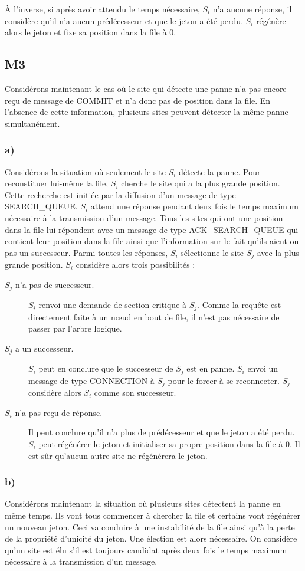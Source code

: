 À l'inverse, si après avoir attendu le temps nécessaire, $S_i$ n'a aucune réponse, il considère qu'il n'a aucun prédécesseur et que le jeton a été perdu. $S_i$ régénère alors le jeton et fixe sa position dans la file à $0$.

\subsection{M3}
Considérons maintenant le cas où le site qui détecte une panne n'a pas encore reçu de message de COMMIT et n'a donc pas de position dans la file. En l'absence de cette information, plusieurs sites peuvent détecter la même panne simultanément.

\subsubsection{a)}
Considérons la situation où seulement le site $S_i$ détecte la panne. Pour reconstituer lui-même la file, $S_i$ cherche le site qui a la plus grande position. Cette recherche est initiée par la diffusion d'un message de type SEARCH\_QUEUE. $S_i$ attend une réponse pendant deux fois le temps maximum nécessaire à la transmission d'un message. Tous les sites qui ont une position dans la file lui répondent avec un message de type ACK\_SEARCH\_QUEUE qui contient leur position dans la file ainsi que l'information sur le fait qu'ils aient ou pas un successeur. Parmi toutes les réponses, $S_i$ sélectionne le site $S_j$ avec la plus grande position. $S_i$ considère alors trois possibilités :
\begin{description}
\item[$S_j$ n'a pas de successeur.] $S_i$ renvoi une demande de section critique à $S_j$. Comme la requête est directement faite à un nœud en bout de file, il n'est pas nécessaire de passer par l'arbre logique.
\item[$S_j$ a un successeur.] $S_i$ peut en conclure que le successeur de $S_j$ est en panne. $S_i$ envoi un message de type CONNECTION à $S_j$ pour le forcer à se reconnecter. $S_j$ considère alors $S_i$ comme son successeur.
\item[$S_i$ n'a pas reçu de réponse.] Il peut conclure qu'il n'a plus de prédécesseur et que le jeton a été perdu. $S_i$ peut régénérer le jeton et initialiser sa propre position dans la file à $0$. Il est sûr qu'aucun autre site ne régénérera le jeton.
\end{description}

\subsubsection{b)}
Considérons maintenant la situation où plusieurs sites détectent la panne en même temps. Ils vont tous commencer à chercher la file et certains vont régénérer un nouveau jeton. Ceci va conduire à une instabilité de la file ainsi qu'à la perte de la propriété d'unicité du jeton. Une élection est alors nécessaire. On considère qu'un site est élu s'il est toujours candidat après deux fois le temps maximum nécessaire à la transmission d'un message.

